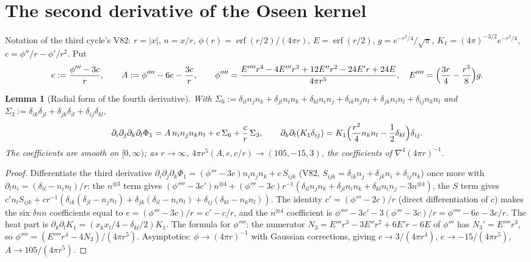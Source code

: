 \documentclass[11pt]{article}
\theoremstyle{plain}
\newtheorem{lemma}[theorem]{Lemma}
\theoremstyle{definition}
\theoremstyle{remark}
\begin{document}
\section{The second derivative of the Oseen kernel}
\label{sec:c4v2-radial}

Notation of the third cycle's V82: \(r=|x|\), \(n=x/r\), \(\phi(r)=\operatorname{erf}(r/2)/(4\pi r)\),
\(E=\operatorname{erf}(r/2)\), \(g=e^{-r^2/4}/\sqrt\pi\), \(K_1=(4\pi)^{-3/2}e^{-r^2/4}\), \(c=\phi''/r-\phi'/r^2\).  Put
\begin{equation}
 e:=\frac{\phi'''-3c}r,\qquad A:=\phi''''-6e-\frac{3c}r,\qquad
 \phi''''=\frac{E''''r^4-4E'''r^3+12E''r^2-24E'r+24E}{4\pi r^5},\quad E''''=\Bigl(\frac{3r}4-\frac{r^3}8\Bigr)g .
 \label{eq:c4v2-coefficients}
\end{equation}

\begin{lemma}[Radial form of the fourth derivative]
\label{lem:c4v2-fourth}
With \(\Sigma_6:=\delta_{il}n_jn_k+\delta_{jl}n_in_k+\delta_{kl}n_in_j+\delta_{ik}n_jn_l+\delta_{jk}n_in_l+\delta_{ij}n_kn_l\) and
\(\Sigma_3:=\delta_{ik}\delta_{jl}+\delta_{jk}\delta_{il}+\delta_{ij}\delta_{kl}\),
\begin{equation}
 \partial_i\partial_j\partial_k\partial_l\Phi_1=A\,n_in_jn_kn_l+e\,\Sigma_6+\frac cr\,\Sigma_3,\qquad
 \partial_k\partial_l(K_1\delta_{ij})=K_1\Bigl(\frac{r^2}4n_kn_l-\frac12\delta_{kl}\Bigr)\delta_{ij} .
 \label{eq:c4v2-tensor}
\end{equation}
The coefficients are smooth on \([0,\infty)\); as \(r\to\infty\),
\(4\pi r^5(A,e,c/r)\to(105,-15,3)\), the coefficients of \(\nabla^4(4\pi r)^{-1}\).
\end{lemma}

\begin{proof}
Differentiate the third derivative \(\partial_i\partial_j\partial_k\Phi_1=(\phi'''-3c)n_in_jn_k+c\,S_{ijk}\)
(V82, \(S_{ijk}=\delta_{ik}n_j+\delta_{jk}n_i+\delta_{ij}n_k\)) once more with \(\partial_ln_i=(\delta_{il}-n_in_l)/r\):
the \(n^{\otimes3}\) term gives \((\phi''''-3c')n^{\otimes4}+(\phi'''-3c)r^{-1}(\delta_{il}n_jn_k+\delta_{jl}n_in_k+\delta_{kl}n_in_j-3n^{\otimes4})\),
the \(S\) term gives \(c'n_lS_{ijk}+cr^{-1}(\delta_{ik}(\delta_{jl}-n_jn_l)+\delta_{jk}(\delta_{il}-n_in_l)+\delta_{ij}(\delta_{kl}-n_kn_l))\).
The identity \(c'=(\phi'''-2c)/r\) (direct differentiation of \(c\)) makes the
six \(\delta nn\) coefficients equal to \(e=(\phi'''-3c)/r=c'-c/r\), and the \(n^{\otimes4}\)
coefficient is \(\phi''''-3c'-3(\phi'''-3c)/r=\phi''''-6e-3c/r\).  The heat part is
\(\partial_k\partial_lK_1=(x_kx_l/4-\delta_{kl}/2)K_1\).  The formula for \(\phi''''\): the numerator
\(N_3=E'''r^3-3E''r^2+6E'r-6E\) of \(\phi'''\) has \(N_3'=E''''r^3\), so
\(\phi''''=(E''''r^4-4N_3)/(4\pi r^5)\).  Asymptotics: \(\phi\to(4\pi r)^{-1}\) with Gaussian
corrections, giving \(c\to3/(4\pi r^4)\), \(e\to-15/(4\pi r^5)\), \(A\to105/(4\pi r^5)\).
\end{proof}
\end{document}
